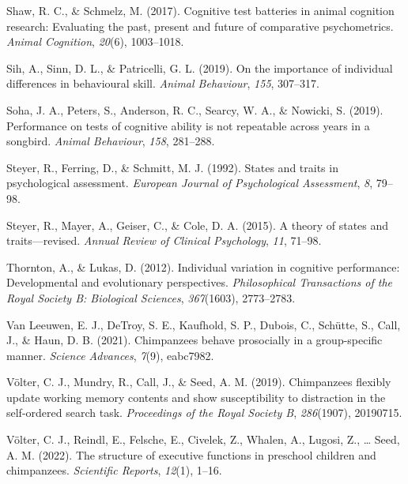 \documentclass[
  man,floatsintext]{apa6}
\newlength{\cslhangindent}
\newlength{\cslentryspacingunit} %
\newenvironment{CSLReferences}[2] %
 {%
  \setlength{\parindent}{0pt}
  \ifodd #1
  \let\oldpar\par
  \def\par{\hangindent=\cslhangindent\oldpar}
  \fi
  \setlength{\parskip}{#2\cslentryspacingunit}
 }%
 {}
\begin{document}
\begin{CSLReferences}{1}{0}
\leavevmode{}%
Shaw, R. C., \& Schmelz, M. (2017). Cognitive test batteries in animal cognition research: Evaluating the past, present and future of comparative psychometrics. \emph{Animal Cognition}, \emph{20}(6), 1003--1018.

\leavevmode{}%
Sih, A., Sinn, D. L., \& Patricelli, G. L. (2019). On the importance of individual differences in behavioural skill. \emph{Animal Behaviour}, \emph{155}, 307--317.

\leavevmode{}%
Soha, J. A., Peters, S., Anderson, R. C., Searcy, W. A., \& Nowicki, S. (2019). Performance on tests of cognitive ability is not repeatable across years in a songbird. \emph{Animal Behaviour}, \emph{158}, 281--288.

\leavevmode{}%
Steyer, R., Ferring, D., \& Schmitt, M. J. (1992). States and traits in psychological assessment. \emph{European Journal of Psychological Assessment}, \emph{8}, 79--98.

\leavevmode{}%
Steyer, R., Mayer, A., Geiser, C., \& Cole, D. A. (2015). A theory of states and traits---revised. \emph{Annual Review of Clinical Psychology}, \emph{11}, 71--98.

\leavevmode{}%
Thornton, A., \& Lukas, D. (2012). Individual variation in cognitive performance: Developmental and evolutionary perspectives. \emph{Philosophical Transactions of the Royal Society B: Biological Sciences}, \emph{367}(1603), 2773--2783.

\leavevmode{}%
Van Leeuwen, E. J., DeTroy, S. E., Kaufhold, S. P., Dubois, C., Schütte, S., Call, J., \& Haun, D. B. (2021). Chimpanzees behave prosocially in a group-specific manner. \emph{Science Advances}, \emph{7}(9), eabc7982.

\leavevmode{}%
Völter, C. J., Mundry, R., Call, J., \& Seed, A. M. (2019). Chimpanzees flexibly update working memory contents and show susceptibility to distraction in the self-ordered search task. \emph{Proceedings of the Royal Society B}, \emph{286}(1907), 20190715.

\leavevmode{}%
Völter, C. J., Reindl, E., Felsche, E., Civelek, Z., Whalen, A., Lugosi, Z., \ldots{} Seed, A. M. (2022). The structure of executive functions in preschool children and chimpanzees. \emph{Scientific Reports}, \emph{12}(1), 1--16.


\end{CSLReferences}
\end{document}
